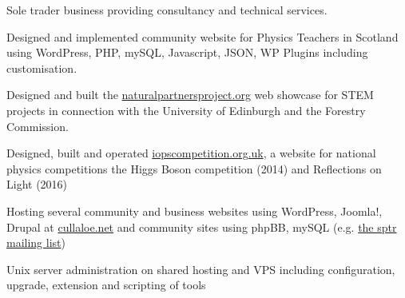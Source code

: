 \documentclass[10pt]{article}
\newenvironment{outerlist}[1][\enskip\textbullet]%
        {\begin{itemize}[#1]}{\end{itemize}%
         \vspace{-.6\baselineskip}}
\newenvironment{innerlist}[1][\enskip\textbullet]%
        {\begin{compactitem}[#1]}{\end{compactitem}}
\begin{document}
\begin{outerlist}
\item[]Sole trader business providing consultancy and technical services.

\begin{innerlist}
	\item Designed and implemented community website for Physics Teachers in Scotland using WordPress, PHP, mySQL, Javascript, JSON, WP Plugins including customisation.
	\item Designed and built the \href{http://naturalpartnersproject.org/}{naturalpartnersproject.org} web showcase for STEM projects in connection with the University of Edinburgh and the Forestry Commission.
	\item Designed, built and operated \href{http://iopscompetition.org.uk/}{iopscompetition.org.uk}, a website for national physics competitions the Higgs Boson competition (2014) and Reflections on Light (2016)
	\item Hosting several community and business websites using WordPress, Joomla!, Drupal at \href{http://cullaloe.net}{cullaloe.net} and community sites using phpBB, mySQL (e.g. \href{http://lists.sptr.net/mailman/listinfo}{the sptr mailing list})
	\item Unix server administration on shared hosting and VPS including configuration, upgrade, extension and scripting of tools
\end{innerlist}
\end{outerlist}
%
\end{document}
